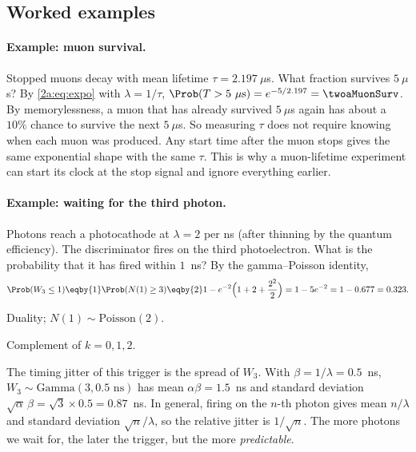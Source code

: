 \subsection{Worked examples}

\paragraph{Example: muon survival.}
Stopped muons decay with mean lifetime $\tau=2.197~\mu$s. What fraction survives $5~\mu$s? By \eqref{2a:eq:expo} with $\lambda=1/\tau$, $\Prob(T>5~\mu\text{s})=e^{-5/2.197}=\twoaMuonSurv$. By memorylessness, a muon that has already survived $5~\mu$s again has about a $10\%$ chance to survive the next $5~\mu$s. So measuring $\tau$ does not require knowing when each muon was produced. Any start time after the muon stops gives the same exponential shape with the same $\tau$. This is why a muon-lifetime experiment can start its clock at the stop signal and ignore everything earlier.

\paragraph{Example: waiting for the third photon.}
Photons reach a photocathode at $\lambda=2$ per ns (after thinning by the quantum efficiency). The discriminator fires on the third photoelectron. What is the probability that it has fired within $1$~ns? By the gamma--Poisson identity,
\begin{align*}
  \Prob(W_3\le1) \eqby{1} \Prob(N(1)\ge3) \eqby{2} 1-e^{-2}\Bigl(1+2+\frac{2^2}{2}\Bigr) = 1-5e^{-2} = 1-0.677 = 0.323 .
\end{align*}
\begin{explain}
  \item Duality; $N(1)\sim\mathrm{Poisson}(2)$.
  \item Complement of $k=0,1,2$.
\end{explain}
The timing jitter of this trigger is the spread of $W_3$. With $\beta=1/\lambda=0.5$~ns, $W_3\sim\mathrm{Gamma}(3,0.5\text{ ns})$ has mean $\alpha\beta=1.5$~ns and standard deviation $\sqrt{\alpha}\,\beta=\sqrt3\times0.5=0.87$~ns. In general, firing on the $n$-th photon gives mean $n/\lambda$ and standard deviation $\sqrt n/\lambda$, so the relative jitter is $1/\sqrt n$. The more photons we wait for, the later the trigger, but the more \emph{predictable}.

